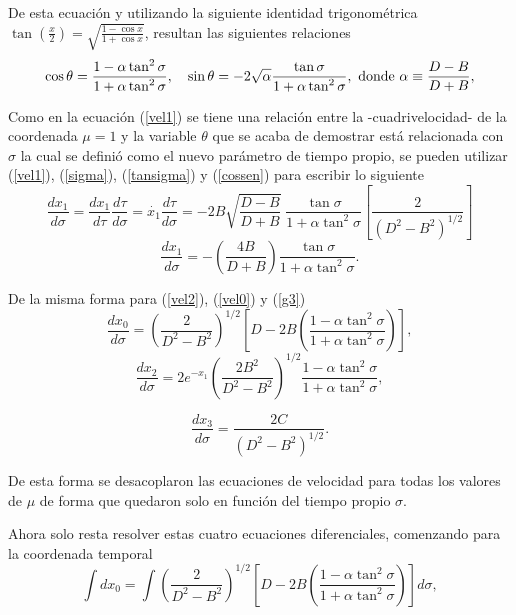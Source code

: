 \documentclass[11pt]{book}
\begin{document}
De esta ecuación y utilizando la siguiente identidad trigonométrica $\tan \left(\frac{x}{2} \right) = \sqrt{\frac{1- \cos x}{1+\cos x}}$, resultan las siguientes relaciones
\begin{equation}
\cos \theta = \frac {1 - \alpha \tan^2 \sigma}{1 + \alpha \tan^2 \sigma}, \quad
\sin\theta = -2 \sqrt{\alpha} \frac{\tan{\sigma}}{ 1+ \alpha \tan^2 \sigma}, 
\hbox{ donde   } \alpha \equiv \frac{D-B}{D+B},
\label{cossen}
\end{equation}

Como en la ecuación (\ref{vel1}) se tiene una relación entre la -cuadrivelocidad- de la coordenada $\mu=1$ y la variable $\theta$ que se acaba de demostrar está relacionada con $\sigma$ la cual se definió como el nuevo parámetro de tiempo propio, se pueden utilizar (\ref{vel1}), (\ref{sigma}), (\ref{tansigma}) y (\ref{cossen}) para escribir lo siguiente
\begin{equation}
\frac{dx_1}{d\sigma}=\frac{dx_1}{d\tau}\frac{d\tau}{d\sigma}=\dot{x_1}\frac{d\tau}{d\sigma}=- 2B \sqrt{\frac{D-B}{D+B}}\; \frac{\tan \sigma}{1+\alpha \tan^2 \sigma} \left[ \frac{2}{(D^2-B^2)^{1/2}} \right]
\end{equation} 
%
\begin{equation}
\frac{dx_1}{d\sigma}=- \left( \frac{4B}{D+B} \right) \frac{\tan \sigma}{1+\alpha \tan^2 \sigma}.
\label{dx1}
\end{equation}

De la misma forma para %
(\ref{vel2}), (\ref{vel0}) y (\ref{g3})
%
\begin{equation}
\frac{dx_{0}}{d\sigma}=\left(\frac{2}{D^{2}-B^{2}}\right)^{1/2}\left[D-2B\left(\frac{1-\alpha \tan^{2}\sigma}{1+\alpha \tan^{2}\sigma}\right)\right],
\label{dx0}
\end{equation}
%
\begin{equation}
\frac{dx_{2}}{d\sigma}=2e^{-x_1}\left( \frac{2B^2}{D^2-B^2} \right)^{1/2} \frac{1-\alpha \tan^{2}\sigma}{1+\alpha \tan^{2}\sigma},
\label{dx2.1}
\end{equation}

\begin{equation}
\frac{dx_{3}}{d \sigma}= \frac{2C}{(D^2-B^2)^{1/2}}.
\label{dx3}
\end{equation}

De esta forma se desacoplaron las ecuaciones de velocidad para todas los valores de $\mu$ de forma que quedaron solo en función del tiempo propio $\sigma$.

Ahora solo resta resolver estas cuatro ecuaciones diferenciales, comenzando para la coordenada temporal
\[
\int dx_0 = \int \left(\frac{2}{D^{2}-B^{2}}\right)^{1/2}\left[D-2B\left(\frac{1-\alpha \tan^{2}\sigma}{1+\alpha \tan^{2}\sigma}\right)\right] d\sigma,
\]
\end{document}
